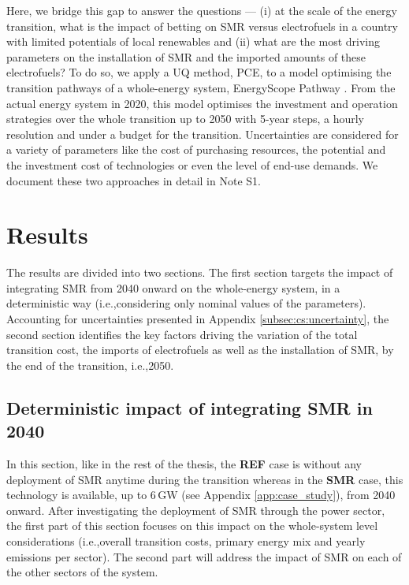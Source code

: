 \documentclass[11pt,twoside,a4paper,english]{article}
\def\ie{i.e.,}
\begin{document}
Here, we bridge this gap to answer the questions — (i) at the scale of the energy transition, what is the impact of betting on \gls{SMR} versus electrofuels in a country with limited potentials of local renewables and (ii) what are the most driving parameters on the installation of \gls{SMR} and the imported amounts of these electrofuels? To do so, we apply a \gls{UQ} method, \gls{PCE}, to a model optimising the transition pathways of a whole-energy system, EnergyScope Pathway \cite{limpens2024pathway}. From the actual energy system in 2020, this model optimises the investment and operation strategies over the whole transition up to 2050 with 5-year steps,  a hourly resolution and under a  budget for the transition. Uncertainties are considered for a variety of parameters like the cost of purchasing resources, the potential and the investment cost of technologies or even the level of end-use demands. We document these two approaches in detail in {\color{red}Note S1}.



\section{Results}
\label{sec:results}
The results are divided into two sections. The first section targets the impact of integrating \gls{SMR} from 2040 onward on the whole-energy system, in a deterministic way (\ie considering only nominal values of the parameters). Accounting for uncertainties presented in Appendix \ref{subsec:cs:uncertainty}, the second section identifies the key factors driving the variation of the total transition cost,  the imports of electrofuels as well as the installation of \gls{SMR}, by the end of the transition, \ie 2050.

\subsection[Deterministic impact of integrating SMR in 2040]{Deterministic impact of integrating \gls{SMR} in 2040}
\label{subsec:atom_mol:results_deter} 
In this section, like in the rest of the thesis, the \textbf{REF} case is without any deployment of \gls{SMR} anytime during the transition whereas in the \textbf{SMR} case, this technology is available, up to 6\,GW (see Appendix \ref{app:case_study}), from 2040 onward. After investigating the deployment of \gls{SMR} through the power sector, the first part of this section focuses on this impact on the whole-system level considerations (\ie overall transition costs, primary energy mix and yearly emissions per sector). The second part will address the impact of \gls{SMR} on each of the other sectors of the system.
\end{document}
